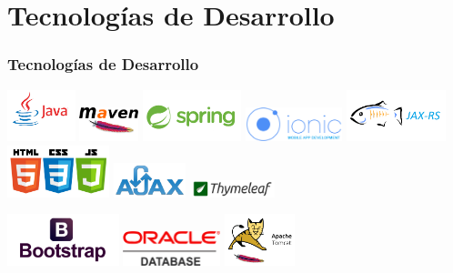 \documentclass{beamer}
\begin{document}
\section{Tecnologías de Desarrollo}
\begin{frame}
\frametitle{Tecnologías de Desarrollo}
\begin{center}
\includegraphics[height=1.5cm, angle=10]{./img/java.png}
\includegraphics[height=1cm]{./img/maven.png}
\includegraphics[height=1.5cm, angle=8]{./img/spring.png}
\includegraphics[height=1cm, angle=-5]{./img/ionic.png}
\includegraphics[height=1.5cm, angle=-5]{./img/jaxrs.png}
\includegraphics[height=1.5cm, angle=-5]{./img/htmlcssjs.png}
\includegraphics[height=1cm, angle=5]{./img/ajax.png}
\includegraphics[height=0.5cm, angle=5]{./img/thymeleaf.png}

\includegraphics[height=1.5cm, angle=12]{./img/bootstrap.png}
\includegraphics[height=1cm]{./img/oracledb.png}
\includegraphics[height=1.5cm, angle=-5]{./img/tomcat.png}

\end{center}
\end{frame}
\end{document}
